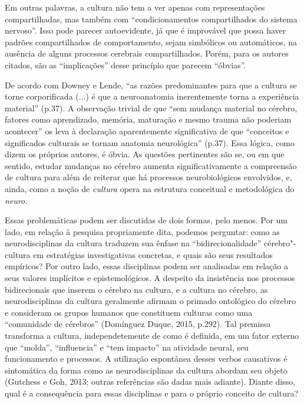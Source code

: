 Em outras palavras, a cultura não tem a ver apenas com representações
compartilhadas, mas também com ``condicionamentos compartilhados do
sistema nervoso''. Isso pode parecer autoevidente, já que é improvável
que possa haver padrões compartilhados de comportamento, sejam
simbólicos ou automáticos, na ausência de alguns processos cerebrais
compartilhados. Porém, para os autores citados, são as ``implicações''
desse princípio que parecem ``óbvias''.

De acordo com Downey e Lende, ``as razões predominantes para que a
cultura se torne corporificada (...) é que a neuroanatomia inerentemente
torna a experiência material'' (p.37). A observação trivial de que ``sem
mudança material no cérebro, fatores como aprendizado, memória,
maturação e mesmo trauma não poderiam acontecer'' os leva à declaração
aparentemente significativa de que ``conceitos e significados culturais
se tornam anatomia neurológica'' (p.37). Essa lógica, como dizem os
próprios autores, é óbvia. As questões pertinentes são se, ou em que
sentido, estudar mudanças no cérebro aumenta significativamente a
compreensão de cultura para além de reiterar que há processos
neurobiológicos envolvidos, e, ainda, como a noção de \emph{cultura}
opera na estrutura conceitual e metodológica do \emph{neuro}.

Essas problemáticas podem ser discutidas de dois formas, pelo menos. Por
um lado, em relação à pesquisa propriamente dita, podemos perguntar:
como as neurodisciplinas da cultura traduzem sua ênfase na
``bidirecionalidade'' cérebro"-cultura em estratégias investigativas
concretas, e quais são seus resultados empíricos? Por outro lado, essas
disciplinas podem ser analisadas em relação a seus valores implícitos e
epistemológicos. A despeito da insistência nos processos bidirecionais
que inserem o cérebro na cultura, e a cultura no cérebro, as
neurodisciplinas da cultura geralmente afirmam o primado ontológico do
cérebro e consideram os grupos humanos que constituem culturas como uma
``comunidade de cérebros'' (Domínguez Duque, 2015, p.292). Tal premissa
transforma a cultura, independetemente de como é definida, em um fator
externo que ``molda'', ``influencia'' e ``tem impacto'' na atividade
neural, seu funcionamento e processos. A utilização espontânea desses
verbos causativos é sintomática da forma como as neurodisciplinas da
cultura abordam seu objeto (Gutchess e Goh, 2013; outras referências são
dadas mais adiante). Diante disso, qual é a consequência para essas
disciplinas e para o próprio conceito de cultura?

